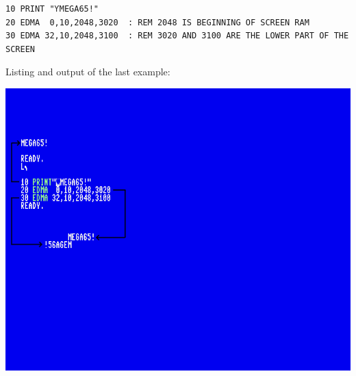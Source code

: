 \begin{description}[leftmargin=2cm,style=nextline]
\begin{tcolorbox}[colback=black,coltext=white]
\verbatimfont{\codefont}
\begin{verbatim}
10 PRINT "ƳMEGA65!"
20 EDMA  0,10,2048,3020  : REM 2048 IS BEGINNING OF SCREEN RAM
30 EDMA 32,10,2048,3100  : REM 3020 AND 3100 ARE THE LOWER PART OF THE SCREEN
\end{verbatim}
\end{tcolorbox}
\clearpage

    Listing and output of the last example:

\item \begin{center}
    \includegraphics[width=\linewidth]{images/basic-example-edma.png}
\end{center}

\end{description}


\newpage

